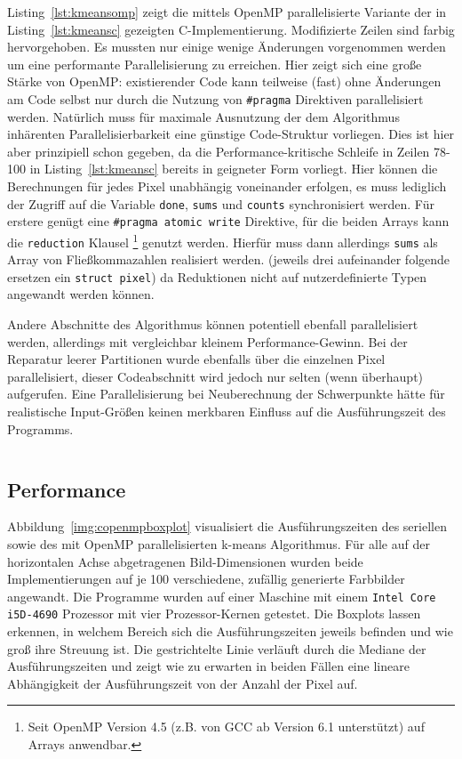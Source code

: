 \documentclass[
    bibliography=totoc, cd=lightcolor, cdmath=false, ngerman]{tudscrreprt}
\begin{document}
Listing~\ref{lst:kmeansomp} zeigt die mittels OpenMP parallelisierte Variante
der in Listing~\ref{lst:kmeansc} gezeigten C-Implementierung. Modifizierte
Zeilen sind farbig hervorgehoben. Es mussten nur einige wenige Änderungen
vorgenommen werden um eine performante Parallelisierung zu erreichen. Hier
zeigt sich eine große Stärke von OpenMP: existierender Code kann teilweise
(fast) ohne Änderungen am Code selbst nur durch die Nutzung von
\texttt{\#pragma} Direktiven parallelisiert werden.  Natürlich muss für
maximale Ausnutzung der dem Algorithmus inhärenten Parallelisierbarkeit eine
günstige Code-Struktur vorliegen. Dies ist hier aber prinzipiell schon
gegeben, da die Performance-kritische Schleife in Zeilen 78-100 in
Listing~\ref{lst:kmeansc} bereits in geigneter Form vorliegt.
Hier können die Berechnungen für jedes Pixel unabhängig voneinander erfolgen,
es muss lediglich der Zugriff auf die Variable \texttt{done},
\texttt{sums} und \texttt{counts} synchronisiert werden. Für erstere genügt
eine \texttt{\#pragma atomic write} Direktive, für die beiden Arrays kann die
\texttt{reduction} Klausel \footnote{Seit OpenMP Version 4.5 (z.B. von GCC ab
Version 6.1 unterstützt) auf Arrays anwendbar.} genutzt werden. Hierfür muss
dann allerdings \texttt{sums} als Array von Fließkommazahlen realisiert werden.
(jeweils drei aufeinander folgende ersetzen ein \texttt{struct pixel}) da
Reduktionen nicht auf nutzerdefinierte Typen angewandt werden können.

Andere Abschnitte des Algorithmus können potentiell ebenfall parallelisiert
werden, allerdings mit vergleichbar kleinem Performance-Gewinn. Bei der
Reparatur leerer Partitionen wurde ebenfalls über die einzelnen Pixel
parallelisiert, dieser Codeabschnitt wird jedoch nur selten (wenn überhaupt)
aufgerufen. Eine Parallelisierung bei Neuberechnung der Schwerpunkte
hätte für realistische Input-Größen keinen merkbaren Einfluss auf die
Ausführungszeit des Programms.

\inputminted[firstline=205, label=kmeansomp, highlightlines={
213, 220-221, 231-232, 249-252, 282, 289-290, 295, 304-307, 309-312, 322,
325-327, 329}]{C}{c/src/kmeans.c}

\subsection{Performance}

Abbildung~\ref{img:copenmpboxplot} visualisiert die Ausführungszeiten des
seriellen sowie des mit OpenMP parallelisierten k-means Algorithmus. Für alle
auf der horizontalen Achse abgetragenen Bild-Dimensionen wurden beide
Implementierungen auf je 100 verschiedene, zufällig generierte Farbbilder
angewandt. Die Programme wurden auf einer Maschine mit einem \texttt{Intel Core
i5D-4690} Prozessor mit vier Prozessor-Kernen getestet. Die Boxplots lassen
erkennen, in welchem Bereich sich die Ausführungszeiten jeweils befinden und
wie groß ihre Streuung ist. Die gestrichtelte Linie verläuft durch die
Mediane der Ausführungszeiten und zeigt wie zu erwarten in beiden Fällen
eine lineare Abhängigkeit der Ausführungszeit von der Anzahl der Pixel auf.
\end{document}
